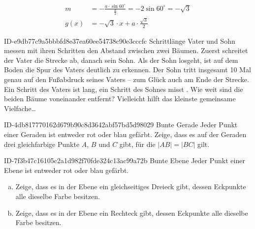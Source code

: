 \begin{exercise}
\begin{minipage}{40mm}
\begin{tikzpicture}
      \end{tikzpicture}
    \end{minipage}\hspace*{\fill}%
    \begin{minipage}{\linecalc}
      \begin{equation*}
        \begin{split}
          m&=-\frac{a\cdot\sin60^\circ}{\frac{a}{2}}=-2\sin60^\circ=-\sqrt{3} \\[2ex]
          g(x)&=-\sqrt{3}\cdot x+a\cdot\frac{\sqrt{3}}{2}
        \end{split}
      \end{equation*}
    \end{minipage}
  \fi
\end{exercise}

\begin{exercise}
      {ID-e9db77c9a5bbbfd8e37ea60ee54738c90e3cccfc}
      {Schrittlänge}
  \ifproblem\problem
    Vater und Sohn messen mit ihren Schritten den Abstand zwischen zwei Bäumen.
    Zuerst schreitet der Vater die Strecke ab, danach sein Sohn. Als der Sohn
    losgeht, ist auf dem Boden die Spur des Vaters deutlich zu erkennen.
    Der Sohn tritt insgesamt 10 Mal genau auf den Fußabdruck seines Vaters --
    zum Glück auch am Ende der Strecke. Ein Schritt des Vaters ist 
    lang, ein Schritt des Sohnes misst . Wie weit sind die beiden
    Bäume voneinander entfernt?
  \fi
  \ifoutline\outline
    Vielleicht hilft das kleinste gemeinsame Vielfache\ldots
  \fi
\end{exercise}

\begin{exercise}
      {ID-4db817770162d679b90c8d3642abf57bd5d98029}
      {Bunte Gerade}
  \ifproblem\problem
    Jeder Punkt einer Geraden ist entweder rot oder blau gefärbt.
    Zeige, dass es auf der Geraden drei gleichfarbige Punkte $A$,
    $B$ und $C$ gibt, für die $|AB|=|BC|$ gilt.
  \fi
\end{exercise}

\begin{exercise}
      {ID-7f3b47c16105c2a1d982f70fde324c13ac99a72b}
      {Bunte Ebene}
  \ifproblem\problem
    Jeder Punkt einer Ebene ist entweder rot oder blau gefärbt.
    \begin{enumerate}[a)]
      \item Zeige, dass es in der Ebene ein gleichseitiges Dreieck gibt,
            dessen Eckpunkte alle dieselbe Farbe besitzen.
      \item Zeige, dass es in der Ebene ein Rechteck gibt,
            dessen Eckpunkte alle dieselbe Farbe besitzen.
    \end{enumerate}
  \fi
\end{exercise}

% 

